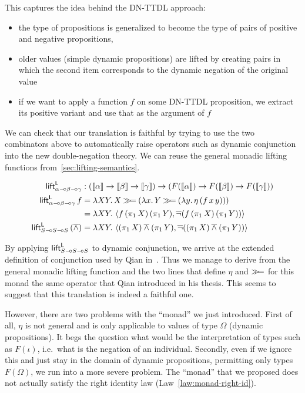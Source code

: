This captures the idea behind the DN-TTDL approach:

\begin{itemize}
\item the type of propositions is generalized to become the type of pairs
  of positive and negative propositions,
\item older values (simple dynamic propositions) are lifted by creating
  pairs in which the second item corresponds to the dynamic negation of the
  original value
\item if we want to apply a function $f$ on some DN-TTDL proposition, we
  extract its positive variant and use that as the argument of $f$
\end{itemize}

We can check that our translation is faithful by trying to use the two
combinators above to automatically raise operators such as dynamic
conjunction into the new double-negation theory. We can reuse the general
monadic lifting functions from~\ref{sec:lifting-semantics}.

\begin{align*}
  \textsf{lift}^{\textsf{L}}_{\alpha \mathbin{{-}\mkern-3.5mu{\circ}} \beta \mathbin{{-}\mkern-3.5mu{\circ}} \gamma} &: (\llbracket \alpha \rrbracket \to \llbracket \beta \rrbracket \to \llbracket \gamma \rrbracket) \to (F(\llbracket \alpha \rrbracket) \to F(\llbracket \beta \rrbracket) \to F(\llbracket \gamma \rrbracket)) \\
  \textsf{lift}^{\textsf{L}}_{\alpha \mathbin{{-}\mkern-3.5mu{\circ}} \beta \mathbin{{-}\mkern-3.5mu{\circ}} \gamma}\,f
     &= \lambda X Y.\, X \mathbin{\gg\!=} (\lambda x.\, Y \mathbin{\gg\!=} (\lambda y.\, \eta\,(f\,x\,y))) \\
     &= \lambda X Y.\, \left< f\,(\pi_1\,X)\,(\pi_1\,Y), \mathop{\overline{\lnot}} (f\,(\pi_1\,X)\,(\pi_1\,Y)) \right> \\
  \textsf{lift}^{\textsf{L}}_{S \mathbin{{-}\mkern-3.5mu{\circ}} S \mathbin{{-}\mkern-3.5mu{\circ}} S}\,(\mathbin{\overline{\land}})
     &= \lambda X Y.\, \left< (\pi_1\,X) \mathbin{\overline{\land}} (\pi_1\,Y), \mathop{\overline{\lnot}} ((\pi_1\,X) \mathbin{\overline{\land}} (\pi_1\,Y)) \right>
\end{align*}

By applying $\textsf{lift}^{\textsf{L}}_{S \mathbin{{-}\mkern-3.5mu{\circ}} S \mathbin{{-}\mkern-3.5mu{\circ}} S}$ to dynamic conjunction, we arrive
at the extended definition of conjunction used by Qian
in~\cite{qian2014accessibility}. Thus we manage to derive from the general
monadic lifting function and the two lines that define $\eta$ and $\mathbin{\gg\!=}$
for this monad the same operator that Qian introduced in his thesis. This
seems to suggest that this translation is indeed a faithful one.

However, there are two problems with the ``monad'' we just
introduced. First of all, $\eta$ is not general and is only applicable to
values of type $\Omega$ (dynamic propositions). It begs the question what
would be the interpretation of types such as $F(\iota)$, i.e.\ what is the
negation of an individual. Secondly, even if we ignore this and just stay
in the domain of dynamic propositions, permitting only types $F(\Omega)$,
we run into a more severe problem. The ``monad'' that we proposed does not
actually satisfy the right identity law (Law~\eqref{law:monad-right-id}).

